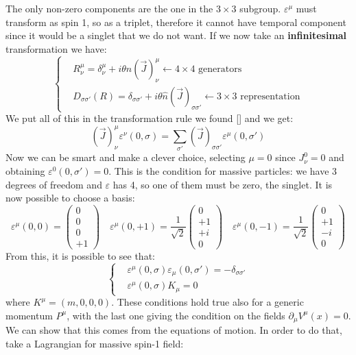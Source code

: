 \documentclass[../main.tex]{subfiles}
\begin{document}
The only non-zero components are the one in the $3\times3$ subgroup. $\varepsilon^\mu$ must transform as spin 1, so as a triplet, therefore it cannot have temporal component since it would be a singlet that we do not want. If we now take an \textbf{infinitesimal} transformation we have:
\[
\left\{
\begin{aligned}
&R^\mu_\nu=\delta^\mu_\nu+i\theta\hat{n}(\vec{J})^\mu_\nu\xleftarrow[]{}\text{$4\times4$ generators}\\
&D_{\sigma\sigma'}(R)=\delta_{\sigma\sigma'}+i\theta\hat{n}(\vec{J})_{\sigma\sigma'}\xleftarrow[]{}\text{$3\times3$ representation}
\end{aligned}
\right.
\]
We put all of this in the transformation rule we found [] and we get:
\[
(\vec{J})^\mu_\nu\varepsilon^\nu(0,\sigma)=\sum_{\sigma'}(\vec{J})_{\sigma\sigma'}\varepsilon^\mu(0,\sigma')
\]
Now we can be smart and make a clever choice, selecting $\mu=0$ since $J^0_\nu=0$ and obtaining $\varepsilon^0(0,\sigma')=0$. This is the condition for massive particles: we have 3 degrees of freedom and $\varepsilon$ has 4, so one of them must be zero, the singlet. It is now possible to choose a basis:
\[
\varepsilon^\mu(0,0)=\left(\begin{array}{c}
    0 \\
    0 \\
    0 \\
    +1
\end{array}\right)
\quad
\varepsilon^\mu(0,+1)=\frac{1}{\sqrt{2}}\left(\begin{array}{c}
    0 \\
    +1 \\
    +i \\
    0
\end{array}\right)
\quad
\varepsilon^\mu(0,-1)=\frac{1}{\sqrt{2}}\left(\begin{array}{c}
    0 \\
    +1 \\
    -i \\
    0
\end{array}\right)
\]
From this, it is possible to see that:
\[
\left\{
\begin{aligned}
&\varepsilon^\mu(0,\sigma)\varepsilon_\mu(0,\sigma')=-\delta_{\sigma\sigma'}\\
&\varepsilon^\mu(0,\sigma)K_\mu=0
\end{aligned}
\right.
\]
where $K^\mu=(m,0,0,0)$. These conditions hold true also for a generic momentum $P^\mu$, with the last one giving the condition on the fields $\partial_\mu V^\mu(x)=0$. We can show that this comes from the equations of motion. In order to do that, take a Lagrangian for massive spin-1 field:
\end{document}
